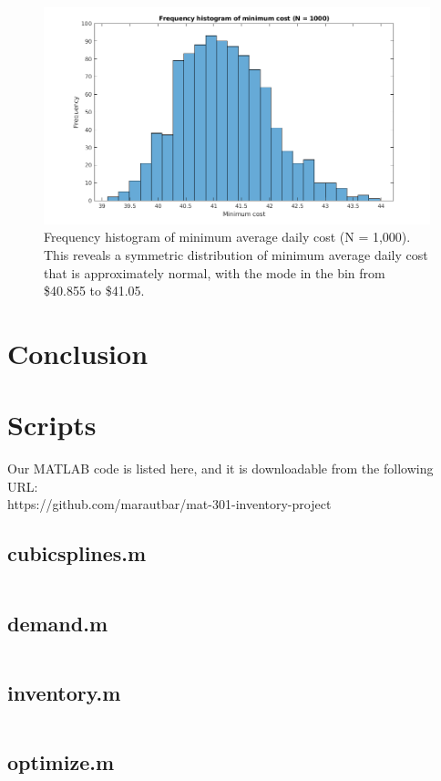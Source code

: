 \documentclass{article}
\begin{document}
    \begin{figure}[h]
        \centering
        \includegraphics[width=\textwidth]{histogram.png}
        \caption{Frequency histogram of minimum average daily cost (N = 1,000). This reveals a symmetric distribution of minimum average daily cost that is approximately normal, with the mode in the bin from \$40.855 to \$41.05.}
        \label{fig:histogram}
    \end{figure}
    \pagebreak
    \section*{Conclusion}
    \pagebreak
    \section*{Scripts}
    Our MATLAB code is listed here, and it is downloadable from the following URL:\\
    https://github.com/marautbar/mat-301-inventory-project
    \subsection*{cubicsplines.m}
    \inputminted[linenos,breaklines]{matlab}{cubicsplines.m}
    \subsection*{demand.m}
    \inputminted[linenos,breaklines]{matlab}{demand.m}
    \subsection*{inventory.m}
    \inputminted[linenos,breaklines]{matlab}{inventory.m}
    \subsection*{optimize.m}
    \inputminted[linenos,breaklines]{matlab}{optimize.m}
\end{document}
